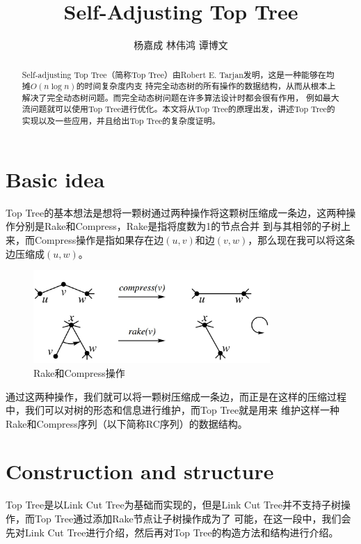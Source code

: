 ﻿\documentclass{article}
\newcommand{\kai}{\CJKfamily{KaiTi}}
\begin{document}
    \title{\textbf{Self-Adjusting Top Tree}}
    \author{杨嘉成\,\,林伟鸿\,\,谭博文}
    \maketitle
	\begin{abstract}\kai
		Self-adjusting Top Tree（简称Top Tree）由Robert E. Tarjan\cite{ref1}发明，这是一种能够在均摊$O(n\log n)$的时间复杂度内支
	持完全动态树的所有操作的数据结构\cite{ref2}，从而从根本上解决了完全动态树问题。而完全动态树问题在许多算法设计时都会很有作用，
	例如最大流问题就可以使用Top Tree进行优化。本文将从Top Tree的原理出发，讲述Top Tree的实现以及一些应用，并且给出Top Tree的复杂度证明。
	\end{abstract}
	\tableofcontents
    \newpage
	\section{Basic idea}
	\indent Top Tree的基本想法是想将一颗树通过两种操作将这颗树压缩成一条边，这两种操作分别是Rake和Compress，Rake是指将度数为1的节点合并
	到与其相邻的子树上来，而Compress操作是指如果存在边$(u, v)$和边$(v, w)$，那么现在我可以将这条边压缩成$(u, w)$。\par
	\begin{figure}[!htbp]
		\centering
		\includegraphics[width=9.0cm]{basicOperations.jpg}
		\caption{Rake和Compress操作}
	\end{figure}
	通过这两种操作，我们就可以将一颗树压缩成一条边，而正是在这样的压缩过程中，我们可以对树的形态和信息进行维护，而Top Tree就是用来
	维护这样一种Rake和Compress序列（以下简称RC序列）的数据结构。\par 
	\section{Construction and structure}
		\indent Top Tree是以Link Cut Tree为基础而实现的，但是Link Cut Tree并不支持子树操作，而Top Tree通过添加Rake节点让子树操作成为了
		可能，在这一段中，我们会先对Link Cut Tree进行介绍，然后再对Top Tree的构造方法和结构进行介绍。
\end{document}
